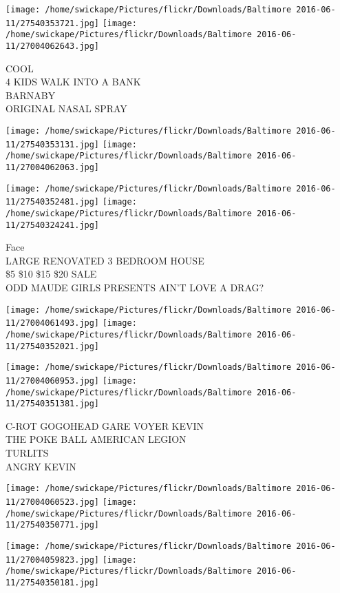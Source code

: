 \documentclass[10pt,letterpaper]{article}
\begin{document}
\texttt{[image: /home/swickape/Pictures/flickr/Downloads/Baltimore 2016-06-11/27540353721.jpg]}
\texttt{[image: /home/swickape/Pictures/flickr/Downloads/Baltimore 2016-06-11/27004062643.jpg]}

COOL\\
4 KIDS WALK INTO A BANK\\
BARNABY\\
ORIGINAL NASAL SPRAY
\pagebreak

\texttt{[image: /home/swickape/Pictures/flickr/Downloads/Baltimore 2016-06-11/27540353131.jpg]}
\texttt{[image: /home/swickape/Pictures/flickr/Downloads/Baltimore 2016-06-11/27004062063.jpg]}

\texttt{[image: /home/swickape/Pictures/flickr/Downloads/Baltimore 2016-06-11/27540352481.jpg]}
\texttt{[image: /home/swickape/Pictures/flickr/Downloads/Baltimore 2016-06-11/27540324241.jpg]}

Face\\
LARGE RENOVATED 3 BEDROOM HOUSE\\
\$5 \$10 \$15 \$20 SALE\\
ODD MAUDE GIRLS PRESENTS AIN'T LOVE A DRAG?
\pagebreak

\texttt{[image: /home/swickape/Pictures/flickr/Downloads/Baltimore 2016-06-11/27004061493.jpg]}
\texttt{[image: /home/swickape/Pictures/flickr/Downloads/Baltimore 2016-06-11/27540352021.jpg]}

\texttt{[image: /home/swickape/Pictures/flickr/Downloads/Baltimore 2016-06-11/27004060953.jpg]}
\texttt{[image: /home/swickape/Pictures/flickr/Downloads/Baltimore 2016-06-11/27540351381.jpg]}

C{-}ROT GOGOHEAD GARE VOYER KEVIN\\
THE POKE BALL AMERICAN LEGION\\
TURLITS\\
ANGRY KEVIN
\pagebreak

\texttt{[image: /home/swickape/Pictures/flickr/Downloads/Baltimore 2016-06-11/27004060523.jpg]}
\texttt{[image: /home/swickape/Pictures/flickr/Downloads/Baltimore 2016-06-11/27540350771.jpg]}

\texttt{[image: /home/swickape/Pictures/flickr/Downloads/Baltimore 2016-06-11/27004059823.jpg]}
\texttt{[image: /home/swickape/Pictures/flickr/Downloads/Baltimore 2016-06-11/27540350181.jpg]}
\end{document}
